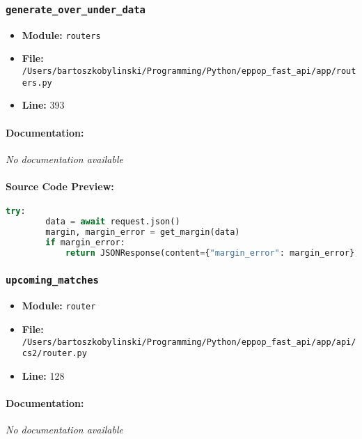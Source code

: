 \documentclass[11pt,a4paper]{article}
\begin{document}
\vspace{1em}
\subsubsection{\texttt{generate\_over\_under\_data}}

\begin{itemize}
    \item \textbf{Module:} \texttt{routers}
    \item \textbf{File:} \texttt{/Users/bartoszkobylinski/Programming/Python/eppop\_fast\_api/app/routers.py}
    \item \textbf{Line:} 393
\end{itemize}

\paragraph{Documentation:} \textit{No documentation available}

\paragraph{Source Code Preview:}
\begin{lstlisting}[language=Python]
    try:
        data = await request.json()
        margin, margin_error = get_margin(data)
        if margin_error:
            return JSONResponse(content={"margin_error": margin_error}, status_code=400)
\end{lstlisting}

\vspace{1em}
\subsubsection{\texttt{upcoming\_matches}}

\begin{itemize}
    \item \textbf{Module:} \texttt{router}
    \item \textbf{File:} \texttt{/Users/bartoszkobylinski/Programming/Python/eppop\_fast\_api/app/api/cs2/router.py}
    \item \textbf{Line:} 128
\end{itemize}

\paragraph{Documentation:} \textit{No documentation available}
\end{document}
